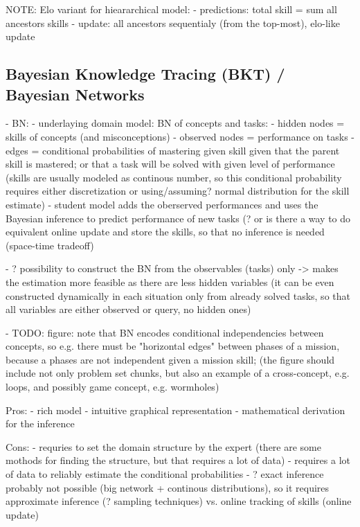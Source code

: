 NOTE: Elo variant for hieararchical model:
- predictions: total skill = sum all ancestors skills
- update: all ancestors sequentialy (from the top-most), elo-like update

\subsection{Bayesian Knowledge Tracing (BKT) / Bayesian Networks}
\label{sec:bkt}

- BN:
  - underlaying domain model: BN of concepts and tasks:
  - hidden nodes = skills of concepts (and misconceptions)
  - observed nodes = performance on tasks
  - edges = conditional probabilities of mastering given skill given that the
  parent skill is mastered; or that a task will be solved with given level of performance
  (skills are usually modeled as continous number, so this conditional probability requires
  either discretization or using/assuming? normal distribution for the skill estimate)
  - student model adds the oberserved performances and uses the Bayesian inference to
  predict performance of new tasks (? or is there a way to do equivalent online update
  and store the skills, so that no inference is needed (space-time tradeoff)

- ? possibility to construct the BN from the observables (tasks) only -> makes the estimation
  more feasible as there are less hidden variables (it can be even constructed dynamically
  in each situation only from already solved tasks, so that all variables are either
  observed or query, no hidden ones)

- TODO: figure: note that BN encodes conditional independencies between concepts,
  so e.g. there must be "horizontal edges" between phases of a mission,
  because a phases are not independent given a mission skill;
  (the figure should include not only problem set chunks, but also an example
  of a cross-concept, e.g. loops, and possibly game concept, e.g. wormholes)

Pros:
- rich model
- intuitive graphical representation
- mathematical derivation for the inference

Cons:
- requries to set the domain structure by the expert (there are some mothods for finding the structure, but that requires a lot of data)
- requires a lot of data to reliably estimate the conditional probabilities
- ? exact inference probably not possible (big network + continous distributions),
  so it requires approximate inference (? sampling techniques)
  vs. online tracking of skills (online update)

